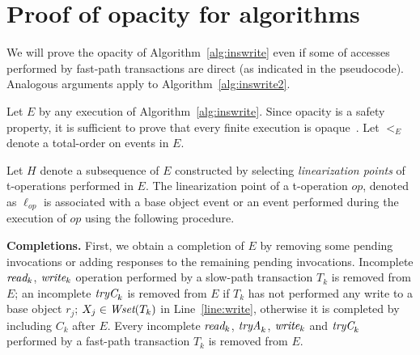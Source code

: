 %


\section{Proof of opacity for algorithms}
\label{app:opacity}
We will prove the opacity of Algorithm~\ref{alg:inswrite} even if some of accesses performed by fast-path transactions are direct (as indicated in the pseudocode).
Analogous arguments apply to Algorithm~\ref{alg:inswrite2}.
%

Let $E$ by any execution of Algorithm~\ref{alg:inswrite}. 
Since opacity is a safety property, it is sufficient to prove that every finite execution is opaque~\cite{icdcs-opacity}.
Let $<_E$ denote a total-order on events in $E$.

Let $H$ denote a subsequence of $E$ constructed by selecting
\emph{linearization points} of t-operations performed in $E$.
The linearization point of a t-operation $op$, denoted as $\ell_{op}$ is associated with  
a base object event or an event performed during 
the execution of $op$ using the following procedure. 

\vspace{1mm}\noindent\textbf{Completions.}
First, we obtain a completion of $E$ by removing some pending
invocations or adding responses to the remaining pending invocations.
Incomplete $\textit{read}_k$, $\textit{write}_k$ operation performed by a slow-path transaction $T_k$ is removed from $E$;
an incomplete $\textit{tryC}_k$ is removed from $E$ if $T_k$ has not performed any write to a base object $r_j$; $X_j \in \textit{Wset}(T_k)$
in Line~\ref{line:write}, otherwise it is completed by including $C_k$ after $E$.
Every incomplete $\textit{read}_k$, $\textit{tryA}_k$, $\textit{write}_k$ and $\textit{tryC}_k$ performed by a fast-path transaction $T_k$ is removed from $E$.

